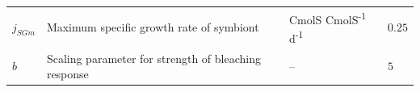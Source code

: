 \documentclass[]{elsarticle} %
\begin{document}
\begin{longtable}[c]{@{}llll@{}}
\begin{minipage}[t]{0.10\columnwidth}
\(j_{SGm}\)
\strut\end{minipage} &
\begin{minipage}[t]{0.48\columnwidth}\raggedright\strut
Maximum specific growth rate of symbiont
\strut\end{minipage} &
\begin{minipage}[t]{0.25\columnwidth}\raggedright\strut
CmolS CmolS\textsuperscript{-1} d\textsuperscript{-1}
\strut\end{minipage} &
\begin{minipage}[t]{0.10\columnwidth}\raggedright\strut
\(0.25\)
\strut\end{minipage}\tabularnewline
\begin{minipage}[t]{0.10\columnwidth}\raggedright\strut
\(b\)
\strut\end{minipage} &
\begin{minipage}[t]{0.48\columnwidth}\raggedright\strut
Scaling parameter for strength of bleaching response
\strut\end{minipage} &
\begin{minipage}[t]{0.25\columnwidth}\raggedright\strut
--
\strut\end{minipage} &
\begin{minipage}[t]{0.10\columnwidth}\raggedright\strut
\(5\)
\strut\end{minipage}\tabularnewline
\bottomrule
\end{longtable}
\end{document}
